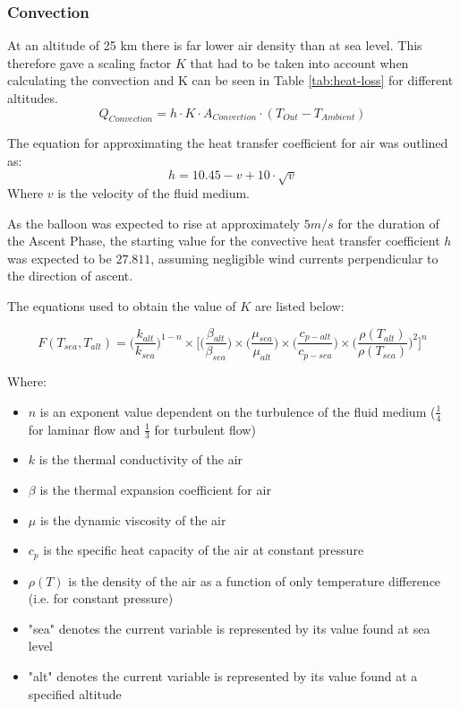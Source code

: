 \subsubsection{Convection}
At an altitude of 25 km there is far lower air density than at sea level. This therefore gave a scaling factor $K$ that had to be taken into account when calculating the convection and K can be seen in Table \ref{tab:heat-loss} for different altitudes.
\begin{equation*}
    Q_{Convection} = h \cdot K \cdot A_{Convection} \cdot (T_{Out} - T_{Ambient})
\end{equation*}

The equation for approximating the heat transfer coefficient for air was outlined as:
\begin{equation*}
h = 10.45 - v + 10\cdot\sqrt{v}
\end{equation*}
Where $v$ is the velocity of the fluid medium.

As the balloon was expected to rise at approximately $5 m/s$ for the duration of the Ascent Phase, the starting value for the convective heat transfer coefficient $h$ was expected to be $27.811$, assuming negligible wind currents perpendicular to the direction of ascent. %

The equations used to obtain the value of $K$ are listed below:

\begin{equation*}
F(T_{sea}, T_{alt}) = \big(\frac{k_{alt}}{k_{sea}}\big)^{1-n}\times \Big[\Big(\frac{\beta_{alt}}{\beta_{sea}}\Big)\times \Big(\frac{\mu_{sea}}{\mu_{alt}}\Big)\times \Big(\frac{c_{p-alt}}{c_{p-sea}}\Big)\times \Big(\frac{\rho(T_{alt})}{\rho(T_{sea})}\Big)^{2}\Big]^{n}
\end{equation*}

Where:
\begin{itemize}
    \item $n$ is an exponent value dependent on the turbulence of the fluid medium ($\frac{1}{4}$ for laminar flow and $\frac{1}{3}$ for turbulent flow)
    \item $k$ is the thermal conductivity of the air
    \item $\beta$ is the thermal expansion coefficient for air
    \item $\mu$ is the dynamic viscosity of the air
    \item $c_{p}$ is the specific heat capacity of the air at constant pressure
    \item $\rho(T)$ is the density of the air as a function of only temperature difference (i.e. for constant pressure)
    \item "sea" denotes the current variable is represented by its value found at sea level
    \item "alt" denotes the current variable is represented by its value found at a specified altitude
\end{itemize}


